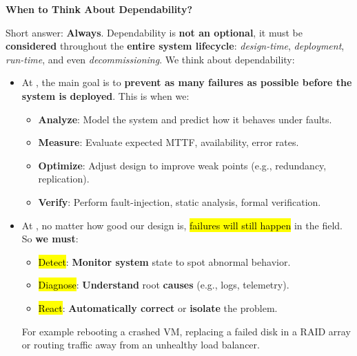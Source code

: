 \highspace
\begin{flushleft}
    \textcolor{Green3}{ \textbf{When to Think About Dependability?}}
\end{flushleft}
Short answer: \textbf{Always}. Dependability is \textbf{not an optional}, it must be \textbf{considered} throughout the \textbf{entire system lifecycle}: \emph{design-time}, \emph{deployment}, \emph{run-time}, and even \emph{decommissioning}. We think about dependability:
\begin{itemize}
    \item At , the main goal is to \textbf{prevent as many failures as possible before the system is deployed}. This is when we:
    \begin{itemize}
        \item \textbf{Analyze}: Model the system and predict how it behaves under faults.
        \item \textbf{Measure}: Evaluate expected MTTF, availability, error rates.
        \item \textbf{Optimize}: Adjust design to improve weak points (e.g., redundancy, replication).
        \item \textbf{Verify}: Perform fault-injection, static analysis, formal verification.
    \end{itemize}
    \item At , no matter how good our design is, \hl{failures will still happen} in the field. So \textbf{we must}:
    \begin{itemize}
        \item \hl{Detect}: \textbf{Monitor system} state to spot abnormal behavior.
        \item \hl{Diagnose}: \textbf{Understand} root \textbf{causes} (e.g., logs, telemetry).
        \item \hl{React}: \textbf{Automatically correct} or \textbf{isolate} the problem.
    \end{itemize}
    For example rebooting a crashed VM, replacing a failed disk in a RAID array or routing traffic away from an unhealthy load balancer.
\end{itemize}

